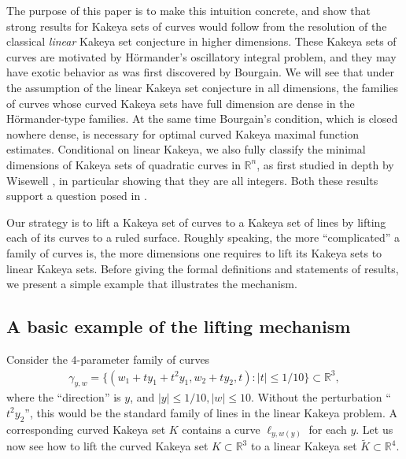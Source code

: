 \documentclass[reqno,11pt]{amsart}
\numberwithin{equation}{section}
\numberwithin{figure}{section}
\def\R{\mathbb{R}}
\renewcommand\leq{\leqslant}
\theoremstyle{plain}
\theoremstyle{definition}
\begin{document}
    The purpose of this paper is to make this intuition concrete,
    and show that strong results for Kakeya sets of curves would follow from the resolution of the classical \emph{linear} Kakeya set conjecture in higher dimensions. These Kakeya sets of curves are motivated by H\"ormander's oscillatory integral problem, and they may have exotic behavior as was first discovered by Bourgain. We will see that under the assumption of the linear Kakeya set conjecture in all dimensions, the families of curves whose curved Kakeya sets have full dimension are dense in the H\"ormander-type families. 
    At the same time Bourgain's condition, which is closed nowhere dense, is necessary for optimal curved Kakeya maximal function estimates. Conditional on linear Kakeya, we also fully classify the minimal dimensions of Kakeya sets of quadratic curves in $\R^n$, as first studied in depth by Wisewell \cite{wisewell}, in particular showing that they are all integers. 
    Both these results support a question posed in \cite{guo2026curvedkakeyaproblemsprojective}.

    
    Our strategy is to lift a Kakeya set of curves to a Kakeya set of lines by lifting each of its curves to a ruled surface. Roughly speaking, the more ``complicated'' a family of curves is, the more dimensions one requires to lift its Kakeya sets to linear Kakeya sets. 
    Before giving the formal definitions and statements of results, we present a simple example that illustrates the mechanism.

    \subsection{A basic example of the lifting mechanism}\label{subsec: worked out example}

    Consider the $4$-parameter family of curves
    \begin{align}
        \gamma_{y,w} = \{(w_1 + t y_1+ t^2y_1, w_2 + t y_2 ,t) : |t| \leq 1/10\} \subset \R^3,
    \end{align}
    where the ``direction'' is $y$, and $|y| \leq 1/10, |w| \leq 10$. Without the perturbation ``$t^2y_2$'', this would be the standard family of lines in the linear Kakeya problem. 
    A corresponding curved Kakeya set $K$ contains a curve $\ell_{y,w(y)}$ for each $y$. 
    Let us now see how to lift the curved Kakeya set $K \subset \R^3$ to a linear Kakeya set $\widetilde K \subset \R^4$. 
\end{document}
